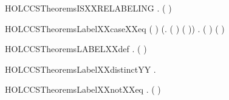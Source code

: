 \newcommand{\HOLCCSTheoremsISXXPROCXXsum}{\UseVerbatim{HOLCCSTheoremsISXXPROCXXsum}}
\begin{SaveVerbatim}{HOLCCSTheoremsISXXRELABELING}
\HOLTokenTurnstile{} \HOLSymConst{\HOLTokenForall{}}.  ( )
\end{SaveVerbatim}
\newcommand{\HOLCCSTheoremsISXXRELABELING}{\UseVerbatim{HOLCCSTheoremsISXXRELABELING}}
\begin{SaveVerbatim}{HOLCCSTheoremsLabelXXcaseXXeq}
\HOLTokenTurnstile{} (    \HOLSymConst{=} ) \HOLSymConst{\HOLTokenEquiv{}}
   (\HOLSymConst{\HOLTokenExists{}}. ( \HOLSymConst{=}  ) \HOLSymConst{\HOLTokenConj{}} (  \HOLSymConst{=} )) \HOLSymConst{\HOLTokenDisj{}}
   \HOLSymConst{\HOLTokenExists{}}. ( \HOLSymConst{=}  ) \HOLSymConst{\HOLTokenConj{}} (  \HOLSymConst{=} )
\end{SaveVerbatim}
\newcommand{\HOLCCSTheoremsLabelXXcaseXXeq}{\UseVerbatim{HOLCCSTheoremsLabelXXcaseXXeq}}
\begin{SaveVerbatim}{HOLCCSTheoremsLABELXXdef}
\HOLTokenTurnstile{} \HOLSymConst{\HOLTokenForall{}}.  ( ) \HOLSymConst{=} 
\end{SaveVerbatim}
\newcommand{\HOLCCSTheoremsLABELXXdef}{\UseVerbatim{HOLCCSTheoremsLABELXXdef}}
\begin{SaveVerbatim}{HOLCCSTheoremsLabelXXdistinctYY}
\HOLTokenTurnstile{} \HOLSymConst{\HOLTokenForall{}} .   \HOLSymConst{\HOLTokenNotEqual{}}  
\end{SaveVerbatim}
\newcommand{\HOLCCSTheoremsLabelXXdistinctYY}{\UseVerbatim{HOLCCSTheoremsLabelXXdistinctYY}}
\begin{SaveVerbatim}{HOLCCSTheoremsLabelXXnotXXeq}
\HOLTokenTurnstile{} \HOLSymConst{\HOLTokenForall{}} . (  \HOLSymConst{=}  ) \HOLSymConst{\HOLTokenEquiv{}} 
\end{SaveVerbatim}
\newcommand{\HOLCCSTheoremsLabelXXnotXXeq}{\UseVerbatim{HOLCCSTheoremsLabelXXnotXXeq}}
